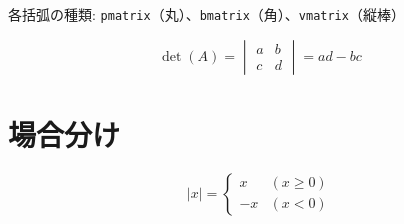 \documentclass[lualatex,ja=standard]{bxjsarticle}
\begin{document}
各括弧の種類: \texttt{pmatrix}（丸）、\texttt{bmatrix}（角）、\texttt{vmatrix}（縦棒）

\[
  \det(A) = \begin{vmatrix}
    a & b \\
    c & d
  \end{vmatrix} = ad - bc
\]

\section{場合分け}

\[
  |x| = \begin{cases}
    x  & (x \geq 0) \\
    -x & (x < 0)
  \end{cases}
\]
\end{document}
